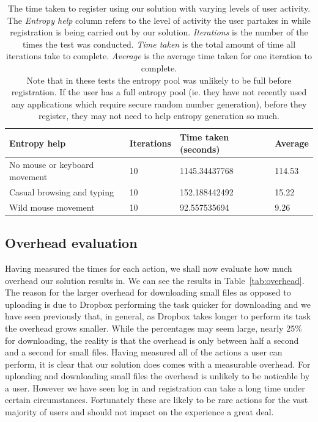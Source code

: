 \documentclass[12pt, titlepage]{article}
\begin{document}
\begin{table}[h]
	\begin{center}
    	\begin{tabular}{ | l | l | l | l |}
    \hline
     \textbf{Entropy help} & \textbf{Iterations} & \textbf{Time taken 		(seconds)} & \textbf{Average} \\ \hline
    No mouse or keyboard movement & 10 & 1145.34437768 & 114.53  \\ \hline
	Casual browsing and typing & 10 & 152.188442492 & 15.22 \\ \hline    
    Wild mouse movement & 10 & 92.557535694 & 9.26 \\ \hline
    
    \end{tabular}
    \caption{The time taken to register using our solution with varying levels of user activity. The \textit{Entropy help} column refers to the level of activity the user partakes in while registration is being carried out by our solution. \textit{Iterations} is the number of the times the test was conducted. \textit{Time taken} is the total amount of time all iterations take to complete. \textit{Average} is the average time taken for one iteration to complete. \\ Note that in these tests the entropy pool was unlikely to be full before registration. If the user has a full entropy pool (ie. they have not recently used any applications which require secure random number generation), before they register, they may not need to help entropy generation so much.}
    \label{tab:registerBenchmark}
   \end{center}
\end{table}

\subsection{Overhead evaluation}
Having measured the times for each action, we shall now evaluate how much overhead our solution results in. We can see the results in Table~\ref{tab:overhead}. The reason for the larger overhead for downloading small files as opposed to uploading is due to Dropbox performing the task quicker for downloading and we have seen previously that, in general, as Dropbox takes longer to perform its task the overhead grows smaller. While the percentages may seem large, nearly 25\% for downloading, the reality is that the overhead is only between half a second and a second for small files.
\newline \indent Having measured all of the actions a user can perform, it is clear that our solution does comes with a measurable overhead. For uploading and downloading small files the overhead is unlikely to be noticable by a user. However we have seen log in and registration can take a long time under certain circumstances. Fortunately these are likely to be rare actions for the vast majority of users and should not impact on the experience a great deal.
\end{document}
